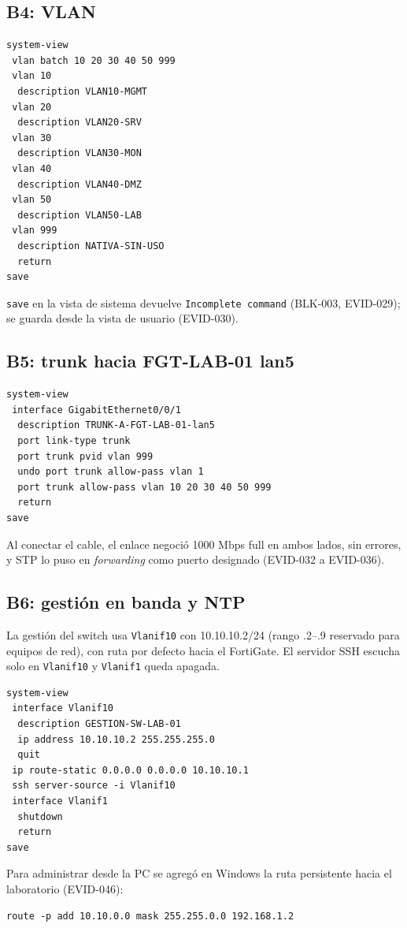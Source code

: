 \documentclass[11pt,a4paper]{article}
\begin{document}
\subsection{B4: VLAN}
\begin{lstlisting}
system-view
 vlan batch 10 20 30 40 50 999
 vlan 10
  description VLAN10-MGMT
 vlan 20
  description VLAN20-SRV
 vlan 30
  description VLAN30-MON
 vlan 40
  description VLAN40-DMZ
 vlan 50
  description VLAN50-LAB
 vlan 999
  description NATIVA-SIN-USO
  return
save
\end{lstlisting}

\texttt{save} en la vista de sistema devuelve \texttt{Incomplete command} (BLK-003, EVID-029); se guarda desde la vista de usuario (EVID-030).

\subsection{B5: trunk hacia FGT-LAB-01 lan5}
\begin{lstlisting}
system-view
 interface GigabitEthernet0/0/1
  description TRUNK-A-FGT-LAB-01-lan5
  port link-type trunk
  port trunk pvid vlan 999
  undo port trunk allow-pass vlan 1
  port trunk allow-pass vlan 10 20 30 40 50 999
  return
save
\end{lstlisting}

Al conectar el cable, el enlace negoció 1000 Mbps full en ambos lados, sin errores, y STP lo puso en \emph{forwarding} como puerto designado (EVID-032 a EVID-036).

\subsection{B6: gestión en banda y NTP}
La gestión del switch usa \texttt{Vlanif10} con 10.10.10.2/24 (rango .2--.9 reservado para equipos de red), con ruta por defecto hacia el FortiGate. El servidor SSH escucha solo en \texttt{Vlanif10} y \texttt{Vlanif1} queda apagada.

\begin{lstlisting}
system-view
 interface Vlanif10
  description GESTION-SW-LAB-01
  ip address 10.10.10.2 255.255.255.0
  quit
 ip route-static 0.0.0.0 0.0.0.0 10.10.10.1
 ssh server-source -i Vlanif10
 interface Vlanif1
  shutdown
  return
save
\end{lstlisting}

Para administrar desde la PC se agregó en Windows la ruta persistente hacia el laboratorio (EVID-046):

\begin{lstlisting}
route -p add 10.10.0.0 mask 255.255.0.0 192.168.1.2
\end{lstlisting}
\end{document}
